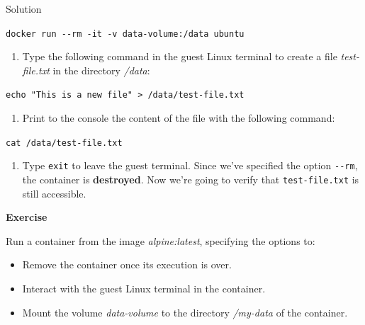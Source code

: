 \documentclass[
]{article}
\providecommand{\tightlist}{%
  \setlength{\itemsep}{0pt}\setlength{\parskip}{0pt}}
\newenvironment{infobox}[1]
  {
  \begin{itemize}
  \renewcommand{\labelitemi}{
    \raisebox{-.7\height}[0pt][0pt]{
      
    }
  }
  \setlength{\fboxsep}{1em}
  \begin{whitebox}
  \item
  }
  {
  \end{whitebox}
  \end{itemize}
  }
\theoremstyle{definition}
\theoremstyle{definition}
\theoremstyle{definition}
\theoremstyle{remark}
\let\BeginKnitrBlock\begin \let\EndKnitrBlock\end
\begin{document}
Solution

\begin{infobox}{exercisebox}
\texttt{docker\ run\ -\/-rm\ -it\ -v\ data-volume:/data\ ubuntu}

\end{infobox}

\begin{enumerate}
\def\labelenumi{\arabic{enumi}.}
\tightlist
\item
  Type the following command in the guest Linux terminal to create a file
  \emph{test-file.txt} in the directory \emph{/data}:
\end{enumerate}

\texttt{echo\ "This\ is\ a\ new\ file"\ \textgreater{}\ /data/test-file.txt}

\begin{enumerate}
\def\labelenumi{\arabic{enumi}.}
\setcounter{enumi}{1}
\tightlist
\item
  Print to the console the content of the file with the following command:
\end{enumerate}

\texttt{cat\ /data/test-file.txt}

\begin{enumerate}
\def\labelenumi{\arabic{enumi}.}
\setcounter{enumi}{2}
\tightlist
\item
  Type \texttt{exit} to leave the guest terminal. Since we've specified the option \texttt{-\/-rm}, the container
  is \textbf{destroyed}. Now we're going to verify that \texttt{test-file.txt} is still accessible.
\end{enumerate}

\begin{infobox}{exercisebox}

\textbf{Exercise}

\BeginKnitrBlock{exercise}
\label{exr:unnamed-chunk-27}{\label{exr:unnamed-chunk-27} }Run a container from the image \emph{alpine:latest},
specifying the options to:

\begin{itemize}
\item
  Remove the container once its execution is over.
\item
  Interact with the guest Linux terminal in the container.
\end{itemize}

\begin{itemize}
\tightlist
\item
  Mount the volume \emph{data-volume} to the directory \emph{/my-data}
  of the container.
\end{itemize}
\EndKnitrBlock{exercise}

\end{infobox}
\end{document}
